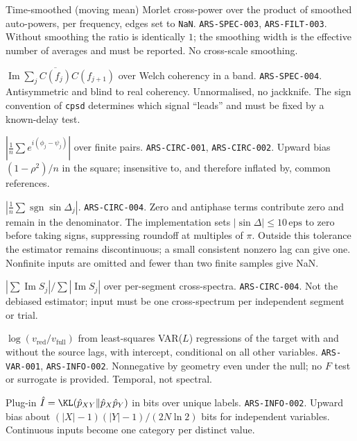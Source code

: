 {Time-smoothed (moving mean) Morlet cross-power over the product of smoothed auto-powers, per frequency, edges set to \texttt{NaN}.}
{\texttt{ARS-SPEC-003}, \texttt{ARS-FILT-003}.}
{Without smoothing the ratio is identically $1$; the smoothing width is the effective number of averages and must be reported. No cross-scale smoothing.}

{$\operatorname{Im}\sum_j\overline{C(f_j)}C(f_{j+1})$ over Welch coherency in a band.}
{\texttt{ARS-SPEC-004}.}
{Antisymmetric and blind to real coherency. Unnormalised, no jackknife. The sign convention of \texttt{cpsd} determines which signal ``leads'' and must be fixed by a known-delay test.}

{$|\frac1n\sum e^{i(\phi_j-\psi_j)}|$ over finite pairs.}
{\texttt{ARS-CIRC-001}, \texttt{ARS-CIRC-002}.}
{Upward bias $(1-\rho^2)/n$ in the square; insensitive to, and therefore inflated by, common references.}

{$|\frac1n\sum\operatorname{sgn}\sin\Delta_j|$.}
{\texttt{ARS-CIRC-004}.}
{Zero and antiphase terms contribute zero and remain in the denominator. The implementation sets $|\sin\Delta|\le10\,\mathrm{eps}$ to zero before taking signs, suppressing roundoff at multiples of $\pi$. Outside this tolerance the estimator remains discontinuous; a small consistent nonzero lag can give one. Nonfinite inputs are omitted and fewer than two finite samples give NaN.}

{$|\sum\operatorname{Im}S_j|/\sum|\operatorname{Im}S_j|$ over per-segment cross-spectra.}
{\texttt{ARS-CIRC-004}.}
{Not the debiased estimator; input must be one cross-spectrum per independent segment or trial.}

{$\log(v_{\text{red}}/v_{\text{full}})$ from least-squares VAR($L$) regressions of the target with and without the source lags, with intercept, conditional on all other variables.}
{\texttt{ARS-VAR-001}, \texttt{ARS-INFO-002}.}
{Nonnegative by geometry even under the null; no $F$ test or surrogate is provided. Temporal, not spectral.}

{Plug-in $\hat I=\KL(\hat p_{XY}\Vert\hat p_X\hat p_Y)$ in bits over unique labels.}
{\texttt{ARS-INFO-002}.}
{Upward bias about $(|X|-1)(|Y|-1)/(2N\ln2)$ bits for independent variables. Continuous inputs become one category per distinct value.}

